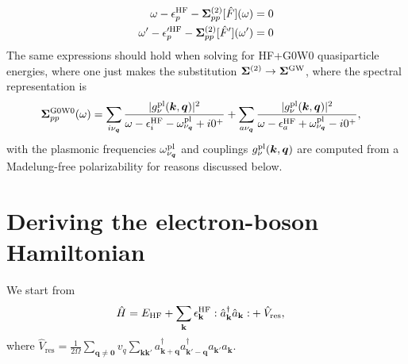 \begin{align}
\omega - \epsilon^{\rm HF}_p - \bm{\Sigma}^{(2)}_{pp}[\hat F](\omega) &= 0\\
\omega' - \epsilon'^{\rm HF}_p - \bm{\Sigma}^{(2)}_{pp}[\hat F'](\omega') &= 0
\end{align}
The same expressions should hold when solving for HF+G0W0 quasiparticle energies, where one just makes the substitution $\bm{\Sigma}^{(2)} \to \bm{\Sigma}^{\rm GW}$, where the spectral representation is
\begin{align}
\bm{\Sigma}^{\rm G 0W0}_{pp}(\omega) &= \sum_{i \nu_{\bm{q}}} \frac{|g_{\nu}^{\rm pl}(\bm{k},\bm{q})|^2}{\omega - \epsilon^{\rm HF}_i - \omega_{\nu_{\bm{q}}}^{\rm pl} + i0^+} + \sum_{a \nu_{\bm{q}}} \frac{|g_{\nu}^{\rm pl}(\bm{k},\bm{q})|^2}{\omega - \epsilon^{\rm HF}_a + \omega_{\nu_{\bm{q}}}^{\rm pl} - i0^+},
\end{align}
with the plasmonic frequencies $\omega_{\nu_{\bm{q}}}^{\rm pl}$ and couplings $g_{\nu}^{\rm pl}(\bm{k},\bm{q})$ are computed from a Madelung-free polarizability for reasons discussed below.
\section{Deriving the electron-boson Hamiltonian}
We start from
\begin{align}
\hat H
&=
E_{\rm HF}
+
{\sum_{\mathbf k}
\epsilon_{\mathbf k}^{\rm HF}
:
\hat a_{\mathbf k}^\dagger \hat a_{\mathbf k}
:}
+
\hat V_{\mathrm{res}},
\end{align}
where $\hat V_{\mathrm{res}}=\frac{1}{2\Omega}
\sum_{\mathbf q\neq\mathbf 0}v_q
\sum_{\mathbf k\mathbf k'}
a_{\mathbf{k}+\mathbf q}^\dagger
a_{\mathbf{k}'-\mathbf q}^\dagger
a_{\mathbf k'}
a_{\mathbf k}$.
